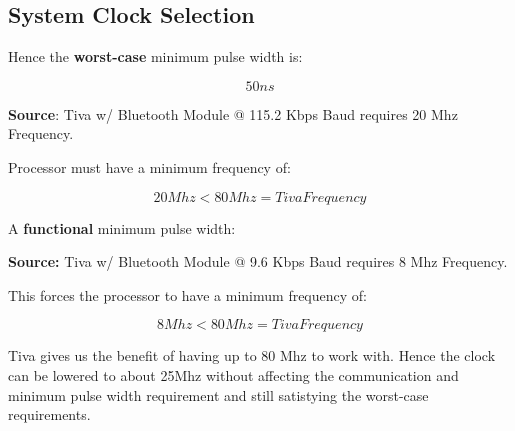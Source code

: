 	\subsection{System Clock Selection}
		Hence the \textbf{worst-case} minimum pulse width is: 

					$$ 50ns $$

		\noindent \textbf{Source}: Tiva w/ Bluetooth Module @ 115.2 Kbps Baud
		requires 20 Mhz Frequency.

		\noindent Processor must have a minimum frequency of:
			
			$$ 20 Mhz < 80Mhz  = Tiva Frequency $$


		\noindent A \textbf{functional} minimum pulse width:

		\noindent \textbf{Source:} Tiva w/ Bluetooth Module @ 9.6 Kbps Baud requires 8 Mhz Frequency.

		\noindent This forces the processor to have a minimum frequency of:
				
				\textbf{$$ 8 Mhz <  80Mhz = Tiva Frequency $$}

		\noindent Tiva gives us the benefit of having up to 80 Mhz to work with. Hence the clock can be
		lowered to about 25Mhz without affecting the communication  and minimum pulse width requirement and
		still satistying the worst-case requirements.




